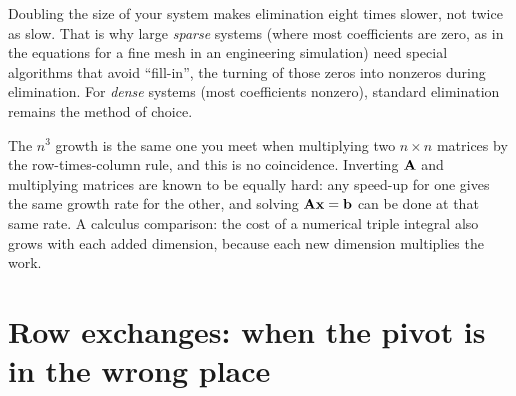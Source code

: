 \begin{aestheticbox}
Doubling the size of your system makes elimination eight times slower, not twice
as slow. That is why large \emph{sparse} systems (where most coefficients are
zero, as in the equations for a fine mesh in an engineering simulation) need
special algorithms that avoid ``fill-in'', the turning of those zeros into
nonzeros during elimination. For \emph{dense} systems (most coefficients
nonzero), standard elimination remains the method of choice.
\end{aestheticbox}

\begin{connectionbox}
The $n^3$ growth is the same one you meet when multiplying two $n\times n$
matrices by the row-times-column rule, and this is no coincidence. Inverting
$\mathbf{A}$ and multiplying matrices are known to be equally hard: any speed-up for
one gives the same growth rate for the other, and solving
$\mathbf{A}\mathbf{x}=\mathbf{b}$ can be done at that same rate. A calculus comparison: the cost of a numerical triple integral also grows
with each added dimension, because each new dimension multiplies the work.
\end{connectionbox}

\section{Row exchanges: when the pivot is in the wrong place}

